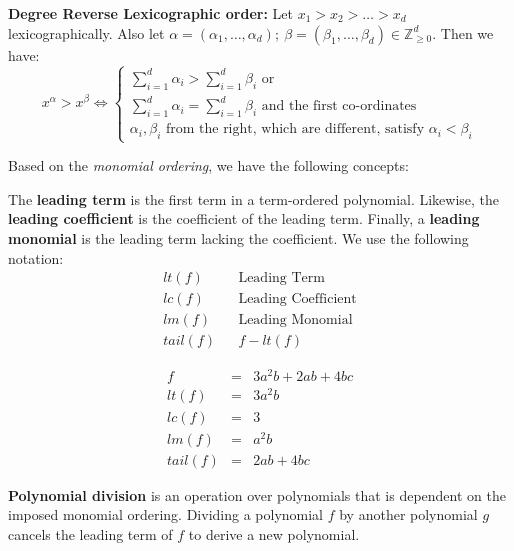 \begin{Definition}
{\bf Degree Reverse Lexicographic order:} Let $x_1 > x_2 > \dots > x_d$
lexicographically. Also let $\alpha = (\alpha_1, \dots, \alpha_d);
~\beta = (\beta_1, \dots, \beta_d) \in \mathbb{Z}^d_{\geq 0}$. Then we
have: 
\begin{equation}
x^{\alpha} > x^{\beta} \iff 
\begin{cases}
\sum_{i=1}^{d}\alpha_i > \sum_{i=1}^{d} \beta_i  \text{ or }\\
\sum_{i=1}^{d}\alpha_i = \sum_{i=1}^{d} \beta_i  \text{ and the first co-ordinates}\\
\text{$\alpha_i, \beta_i$ from the right, which are different, satisfy $\alpha_i < \beta_i$}
\end{cases}
\end{equation}

\end{Definition}

Based on the {\it monomial ordering}, we have the following concepts:

\begin{Definition}
The {\bf leading term} is the first term in a term-ordered polynomial.
Likewise, the {\bf leading coefficient} is the coefficient of
the leading term. 
Finally, a {\bf leading monomial} is the leading term 
lacking the coefficient.  We use the following notation:
\begin{eqnarray}
     lt(f)&& \text{Leading Term} \\
     lc(f)&& \text{Leading Coefficient} \\
     lm(f)&& \text{Leading Monomial} \\
     tail(f)&& f - lt(f)
\end{eqnarray}
\end{Definition}

\begin{Example}
\begin{eqnarray}
     f      &=& 3a^2b + 2ab + 4bc \\
     lt(f)  &=& 3a^2b \\
     lc(f)  &=& 3 \\
     lm(f)  &=& a^2b \\
     tail(f) &=& 2ab+4bc
\end{eqnarray}
\end{Example}

{\bf Polynomial division} is an operation over polynomials that is dependent on
the imposed monomial ordering. Dividing a polynomial $f$ by another polynomial
$g$ cancels the leading term of $f$ to derive a new polynomial. 

